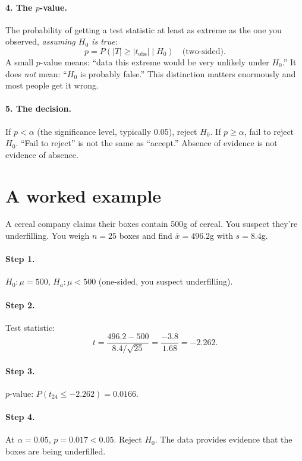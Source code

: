 \paragraph{4. The $p$-value.} The probability of getting a test statistic at least as extreme as the one you observed, \emph{assuming $H_0$ is true}:
\begin{equation}
  p = P(|T| \geq |t_{\text{obs}}| \mid H_0) \quad \text{(two-sided)}.
  \label{eq:p-value}
\end{equation}
A small $p$-value means: ``data this extreme would be very unlikely under $H_0$.'' It does \emph{not} mean: ``$H_0$ is probably false.'' This distinction matters enormously and most people get it wrong.

\paragraph{5. The decision.} If $p < \alpha$ (the significance level, typically 0.05), reject $H_0$. If $p \geq \alpha$, fail to reject $H_0$. ``Fail to reject'' is not the same as ``accept.'' Absence of evidence is not evidence of absence.

\section{A worked example}

A cereal company claims their boxes contain 500g of cereal. You suspect they're underfilling. You weigh $n = 25$ boxes and find $\bar{x} = 496.2$g with $s = 8.4$g.

\paragraph{Step 1.} $H_0\colon \mu = 500$, \quad $H_a\colon \mu < 500$ (one-sided, you suspect underfilling).

\paragraph{Step 2.} Test statistic:
\[
  t = \frac{496.2 - 500}{8.4/\sqrt{25}} = \frac{-3.8}{1.68} = -2.262.
\]

\paragraph{Step 3.} $p$-value: $P(t_{24} \leq -2.262) = 0.0166$.

\paragraph{Step 4.} At $\alpha = 0.05$, $p = 0.017 < 0.05$. Reject $H_0$. The data provides evidence that the boxes are being underfilled.

